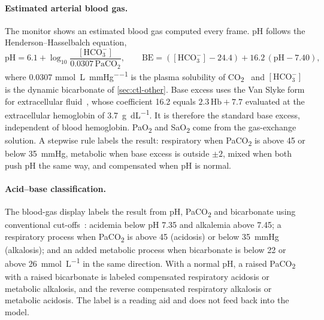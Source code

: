 \paragraph{Estimated arterial blood gas.} The monitor shows an estimated blood gas computed every frame. pH follows the Henderson--Hasselbalch equation,
\begin{equation}
\mathrm{pH}=6.1+\log_{10}\frac{[\mathrm{HCO_3^-}]}{0.0307\,\mathrm{PaCO_2}},\qquad
\mathrm{BE}=([\mathrm{HCO_3^-}]-24.4)+16.2\,(\mathrm{pH}-7.40),
\label{eq:gx-abg}
\end{equation}
where 0.0307 \si{\milli\mole\per\liter\per\mmHg} is the plasma solubility of CO\textsubscript{2}~\citep{narins1980} and $[\mathrm{HCO_3^-}]$ is the dynamic bicarbonate of \cref{sec:ctl-other}. Base excess uses the Van Slyke form for extracellular fluid~\citep{siggaardandersen1963}, whose coefficient 16.2 equals $2.3\,\mathrm{Hb}+7.7$ evaluated at the extracellular hemoglobin of \SI{3.7}{\gram\per\deci\liter}. It is therefore the standard base excess, independent of blood hemoglobin. PaO\textsubscript{2} and SaO\textsubscript{2} come from the gas-exchange solution. A stepwise rule labels the result: respiratory when PaCO\textsubscript{2} is above 45 or below \SI{35}{\mmHg}, metabolic when base excess is outside $\pm2$, mixed when both push pH the same way, and compensated when pH is normal.

\paragraph{Acid--base classification.} The blood-gas display labels the result from pH, PaCO\textsubscript{2} and bicarbonate using conventional cut-offs~\citep{narins1980}: acidemia below pH 7.35 and alkalemia above 7.45; a respiratory process when PaCO\textsubscript{2} is above 45 (acidosis) or below \SI{35}{\mmHg} (alkalosis); and an added metabolic process when bicarbonate is below 22 or above \SI{26}{\milli\mole\per\liter} in the same direction. With a normal pH, a raised PaCO\textsubscript{2} with a raised bicarbonate is labeled compensated respiratory acidosis or metabolic alkalosis, and the reverse compensated respiratory alkalosis or metabolic acidosis. The label is a reading aid and does not feed back into the model.

